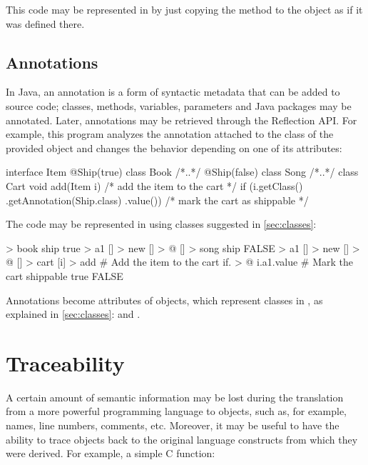 \documentclass[sigplan,nonacm]{acmart}
\begin{document}
This code may be represented in \eolang{} by just copying the method  to the object  as if it was defined there.

\subsection{Annotations}
\label{sec:annotations}

In Java, an annotation is a form of syntactic metadata that can be added to source code; classes, methods, variables, parameters and Java packages may be annotated. Later, annotations may be retrieved through the Reflection API. For example, this program analyzes the annotation attached to the class of the provided object and changes the behavior depending on one of its attributes:

\begin{ffcode}
interface Item {}
@Ship(true) class Book { /*..*/ }
@Ship(false) class Song { /*..*/ }
class Cart {
  void add(Item i) {
    /* add the item to the cart */
    if (i.getClass()
      .getAnnotation(Ship.class)
      .value()) {
      /* mark the cart as shippable */
    }
  }
}
\end{ffcode}

The code may be represented in \eolang{} using classes suggested in \cref{sec:classes}:

\begin{ffcode}
[] > book
  ship true > a1
  [] > new
    [] > @
[] > song
  ship FALSE > a1
  [] > new
    [] > @
[] > cart
  [i] > add
    # Add the item to the cart
    if. > @
      i.a1.value
        # Mark the cart shippable
        true
        FALSE
\end{ffcode}

Annotations become attributes of objects, which represent classes in \eolang{}, as explained in \cref{sec:classes}:  and .

\section{Traceability}

A certain amount of semantic information may be lost during the translation from a more powerful programming language to \eolang{} objects, such as, for example, names, line numbers, comments, etc. Moreover, it may be useful to have the ability to trace \eolang{} objects back to the original language constructs from which they were derived. For example, a simple C function:
\end{document}
